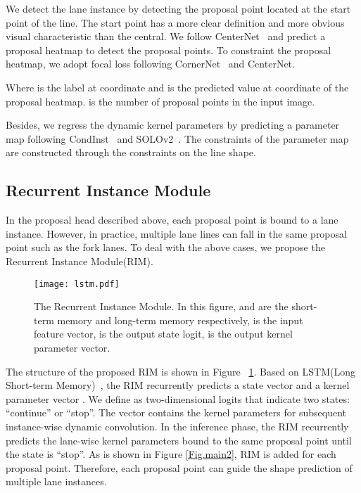 \documentclass[10pt,twocolumn,letterpaper]{article}
\begin{document}
We detect the lane instance by detecting the proposal point located at the start point of the line. The start point has a more clear definition and more obvious visual characteristic than the central. We follow CenterNet~\cite{duan2019centernet} and predict a proposal heatmap to detect the proposal points.
To constraint the proposal heatmap, we adopt focal loss following CornerNet~\cite{law2018cornernet} and CenterNet\cite{duan2019centernet}.


Where  is the label at coordinate  and  is the predicted value at coordinate  of the proposal heatmap.  is the number of proposal points in the input image.

Besides, we regress the dynamic kernel parameters by predicting a parameter map following CondInst~\cite{tian2020conditional} and SOLOv2~\cite{wang2020solov2}. The constraints of the parameter map are constructed through the constraints on the line shape.

\subsection{Recurrent Instance Module}
In the proposal head described above, each proposal point is bound to a lane instance. However, in practice, multiple lane lines can fall in the same proposal point such as the fork lanes. To deal with the above cases, we propose the Recurrent Instance Module(RIM).

\begin{figure}[h]
\begin{center}
\texttt{[image: lstm.pdf]}
\end{center}
   \caption{The Recurrent Instance Module. In this figure,  and  are the short-term memory and long-term memory respectively,  is the input feature vector,  is the output state logit,  is the output kernel parameter vector.}
\label{Fig.lstm}
\end{figure}
The structure of the proposed RIM is shown in Figure ~\ref{Fig.lstm}. Based on LSTM(Long Short-term Memory)~\cite{hochreiter1997long}, the RIM recurrently predicts a state vector  and a kernel parameter vector . We define   as two-dimensional logits that indicate two states: ``continue'' or ``stop''. The vector  contains the kernel parameters for subsequent instance-wise dynamic convolution. In the inference phase, the RIM recurrently predicts the lane-wise kernel parameters bound to the same proposal point until the state is ``stop''. As is shown in Figure \ref{Fig.main2}, RIM is added for each proposal point. Therefore, each proposal point can guide the shape prediction of multiple lane instances.
\end{document}
